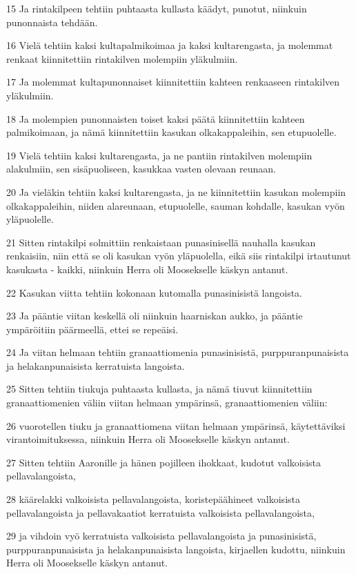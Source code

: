 \par 15 Ja rintakilpeen tehtiin puhtaasta kullasta käädyt, punotut, niinkuin punonnaista tehdään.
\par 16 Vielä tehtiin kaksi kultapalmikoimaa ja kaksi kultarengasta, ja molemmat renkaat kiinnitettiin rintakilven molempiin yläkulmiin.
\par 17 Ja molemmat kultapunonnaiset kiinnitettiin kahteen renkaaseen rintakilven yläkulmiin.
\par 18 Ja molempien punonnaisten toiset kaksi päätä kiinnitettiin kahteen palmikoimaan, ja nämä kiinnitettiin kasukan olkakappaleihin, sen etupuolelle.
\par 19 Vielä tehtiin kaksi kultarengasta, ja ne pantiin rintakilven molempiin alakulmiin, sen sisäpuoliseen, kasukkaa vasten olevaan reunaan.
\par 20 Ja vieläkin tehtiin kaksi kultarengasta, ja ne kiinnitettiin kasukan molempiin olkakappaleihin, niiden alareunaan, etupuolelle, sauman kohdalle, kasukan vyön yläpuolelle.
\par 21 Sitten rintakilpi solmittiin renkaistaan punasinisellä nauhalla kasukan renkaisiin, niin että se oli kasukan vyön yläpuolella, eikä siis rintakilpi irtautunut kasukasta - kaikki, niinkuin Herra oli Moosekselle käskyn antanut.
\par 22 Kasukan viitta tehtiin kokonaan kutomalla punasinisistä langoista.
\par 23 Ja pääntie viitan keskellä oli niinkuin haarniskan aukko, ja pääntie ympäröitiin päärmeellä, ettei se repeäisi.
\par 24 Ja viitan helmaan tehtiin granaattiomenia punasinisistä, purppuranpunaisista ja helakanpunaisista kerratuista langoista.
\par 25 Sitten tehtiin tiukuja puhtaasta kullasta, ja nämä tiuvut kiinnitettiin granaattiomenien väliin viitan helmaan ympärinsä, granaattiomenien väliin:
\par 26 vuorotellen tiuku ja granaattiomena viitan helmaan ympärinsä, käytettäviksi virantoimituksessa, niinkuin Herra oli Moosekselle käskyn antanut.
\par 27 Sitten tehtiin Aaronille ja hänen pojilleen ihokkaat, kudotut valkoisista pellavalangoista,
\par 28 käärelakki valkoisista pellavalangoista, koristepäähineet valkoisista pellavalangoista ja pellavakaatiot kerratuista valkoisista pellavalangoista,
\par 29 ja vihdoin vyö kerratuista valkoisista pellavalangoista ja punasinisistä, purppuranpunaisista ja helakanpunaisista langoista, kirjaellen kudottu, niinkuin Herra oli Moosekselle käskyn antanut.
